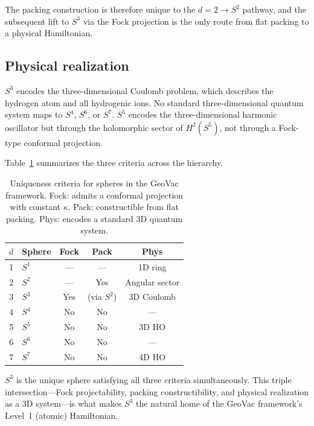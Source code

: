 \documentclass[twocolumn,pra,amsmath,amssymb,superscriptaddress]{revtex4-2}
\begin{document}
The packing construction is therefore unique to the $d = 2 \to S^2$
pathway, and the subsequent lift to $S^3$ via the Fock projection
is the only route from flat packing to a physical Hamiltonian.

\subsection{Physical realization}

$S^3$ encodes the three-dimensional Coulomb problem, which
describes the hydrogen atom and all hydrogenic ions.  No standard
three-dimensional quantum system maps to $S^4$, $S^6$, or $S^7$.
$S^5$ encodes the three-dimensional harmonic oscillator but through
the holomorphic sector of $H^2(S^5)$, not through a Fock-type
conformal projection.

Table~\ref{tab:uniqueness} summarizes the three criteria across
the hierarchy.

\begin{table}
\caption{Uniqueness criteria for spheres in the GeoVac framework.
Fock: admits a conformal projection with constant $\kappa$.
Pack: constructible from flat packing.
Phys: encodes a standard 3D quantum system.
\label{tab:uniqueness}}
\begin{ruledtabular}
\begin{tabular}{clccc}
$d$ & Sphere & Fock & Pack & Phys \\
\hline
1 & $S^1$ & --- & --- & 1D ring \\
2 & $S^2$ & --- & Yes & Angular sector \\
3 & $S^3$ & Yes & (via $S^2$) & 3D Coulomb \\
4 & $S^4$ & No  & No  & --- \\
5 & $S^5$ & No  & No  & 3D HO\footnotemark[1] \\
6 & $S^6$ & No  & No  & --- \\
7 & $S^7$ & No  & No  & 4D HO\footnotemark[1] \\
\end{tabular}
\end{ruledtabular}
\end{table}

$S^3$ is the unique sphere satisfying all three criteria
simultaneously.  This triple intersection---Fock projectability,
packing constructibility, and physical realization as a 3D
system---is what makes $S^3$ the natural home of the GeoVac
framework's Level~1 (atomic) Hamiltonian.
\end{document}
